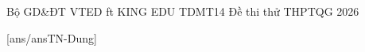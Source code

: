 \def\linkdethi{} %
\anmaQR
\def\toanlop{12}
\def\thoigian{90}
\def\namhoc{2025 - 2026}
\begin{dethi}
	{Bộ GD\&ĐT}
	{VTED ft KING EDU}
	{TDMT14}
	{Đề thi thử THPTQG 2026}
\end{dethi}
\caulc
{}[ans/ansTN-Dung]
%
